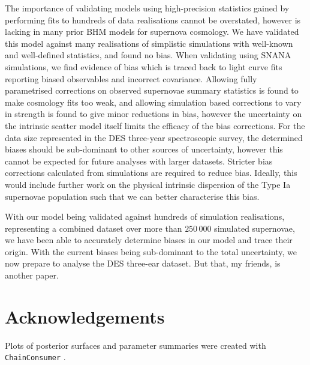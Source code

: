 \documentclass[a4paper,fleqn,usenatbib]{mnras}
\begin{document}
The importance of validating models using high-precision statistics gained by performing fits to hundreds of data realisations cannot be overstated, however is lacking in many prior BHM models for supernova cosmology. We have validated this model against many realisations of simplistic simulations with well-known and well-defined statistics, and found no bias. When validating using SNANA simulations, we find evidence of bias which is traced back to light curve fits reporting biased observables and incorrect covariance. Allowing fully parametrised corrections on observed supernovae summary statistics is found to make cosmology fits too weak, and allowing simulation based corrections to vary in strength is found to give minor reductions in bias, however the uncertainty on the intrinsic scatter model itself limits the efficacy of the bias corrections. For the data size represented in the DES three-year spectroscopic survey, the determined biases should be sub-dominant to other sources of uncertainty, however this cannot be expected for future analyses with larger datasets. Stricter bias corrections calculated from simulations are required to reduce bias. Ideally, this would include further work on the physical intrinsic dispersion of the Type Ia supernovae population such that we can better characterise this bias.

With our model being validated against hundreds of simulation realisations, representing a combined dataset over more than $250\,000$ simulated supernovae, we have been able to accurately determine biases in our model and trace their origin. With the current biases being sub-dominant to the total uncertainty, we now prepare to analyse the DES three-ear dataset. But that, my friends, is another paper.

\section*{Acknowledgements}

Plots of posterior surfaces and parameter summaries were created with \verb|ChainConsumer| \citep{Hinton2016}.











\end{document}
